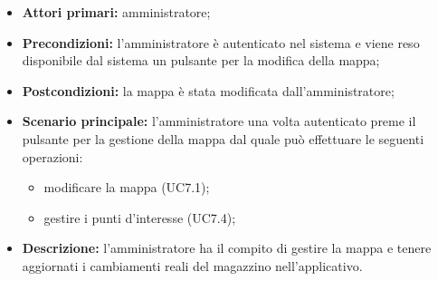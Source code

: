 \begin{itemize}
	\item 	\textbf{Attori primari:} amministratore;
	\item 	\textbf{Precondizioni:} l’amministratore è autenticato nel sistema e viene reso disponibile dal sistema un pulsante per la modifica della mappa;
	\item 	\textbf{Postcondizioni:} la mappa è stata modificata dall’amministratore;
	\item 	\textbf{Scenario principale:} l’amministratore una volta autenticato preme il pulsante per la gestione della mappa dal quale può effettuare le seguenti operazioni:
	\begin{itemize}
		\item modificare la mappa (UC7.1);
		\item gestire i punti d’interesse (UC7.4);
	\end{itemize}
	\item 	\textbf{Descrizione:} l’amministratore ha il compito di gestire la mappa e tenere aggiornati i cambiamenti reali del magazzino nell’applicativo.
\end{itemize}


